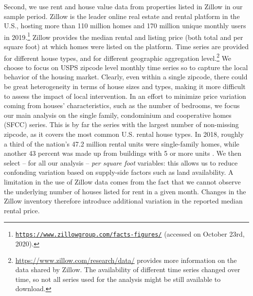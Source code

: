 Second, we use rent and house value data from properties listed in Zillow \parencite{zillow} in our 
sample period. Zillow is the leader online real estate and rental platform in the U.S., hosting more 
than 110 million homes and 170 million unique monthly users in 
2019.\footnote{\href{https://www.zillowgroup.com/facts-figures/}
	{\texttt{https://www.zillowgroup.com/facts-figures/}} (accessed on October 23rd, 2020).}  
Zillow provides the median rental and listing price (both total and per square foot) at which homes 
were listed on the platform. Time series are provided for different house types, and for different 
geographic aggregation level.\footnote{\href{https://www.zillow.com/research/data/}
	{https://www.zillow.com/research/data/} provides more information on the data shared by Zillow. 
	The availability of different time series changed over time, so not all series used for the 
	analysis might be still available to download.} 
We choose to focus on USPS zipcode level monthly time series so to capture the local behavior of the 
housing market. Clearly, even within a single zipcode, there could be great heterogeneity in terms of 
house sizes and types, making it more difficult to assess the impact of local intervention. In an 
effort to minimize price variation coming from houses' characteristics, such as the number of bedrooms, we focus our main analysis on the single family, condominium and cooperative homes (SFCC) series. 
This is by far the series with the largest number of non-missing zipcode, as it covers the most 
common U.S. rental house types. In 2018, roughly a third of the nation's 47.2 million rental units 
were single-family homes, while another 43 percent was made up from buildings with 5 or more units 
\parencite{jchs2020rentalreport}. We then select -- for all our analysis -- \textit{per square foot} 
variables: this allows us to reduce confonding variation based on supply-side factors such as land 
availability. A limitation in the use of Zillow data comes from the fact that we cannot observe the 
underlying number of houses listed for rent in a given month. Changes in the Zillow inventory 
therefore introduce additional variation in the reported median rental price.

